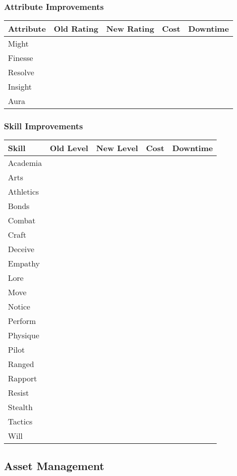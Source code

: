 \documentclass[11pt,letterpaper]{article}
\begin{document}
\subsubsection{Attribute Improvements}
\begin{tabularx}{\textwidth}{|l|c|c|c|c|}
\hline
\textbf{Attribute} & \textbf{Old Rating} & \textbf{New Rating} & \textbf{Cost} & \textbf{Downtime} \\
\hline
Might & & & & \\
Finesse & & & & \\
Resolve & & & & \\
Insight & & & & \\
Aura & & & & \\
\hline
\end{tabularx}

\subsubsection{Skill Improvements}
\begin{tabularx}{\textwidth}{|l|c|c|c|c|}
\hline
\textbf{Skill} & \textbf{Old Level} & \textbf{New Level} & \textbf{Cost} & \textbf{Downtime} \\
\hline
Academia & & & & \\
Arts & & & & \\
Athletics & & & & \\
Bonds & & & & \\
Combat & & & & \\
Craft & & & & \\
Deceive & & & & \\
Empathy & & & & \\
Lore & & & & \\
Move & & & & \\
Notice & & & & \\
Perform & & & & \\
Physique & & & & \\
Pilot & & & & \\
Ranged & & & & \\
Rapport & & & & \\
Resist & & & & \\
Stealth & & & & \\
Tactics & & & & \\
Will & & & & \\
\hline
\end{tabularx}

\subsection{Asset Management}
\end{document}
